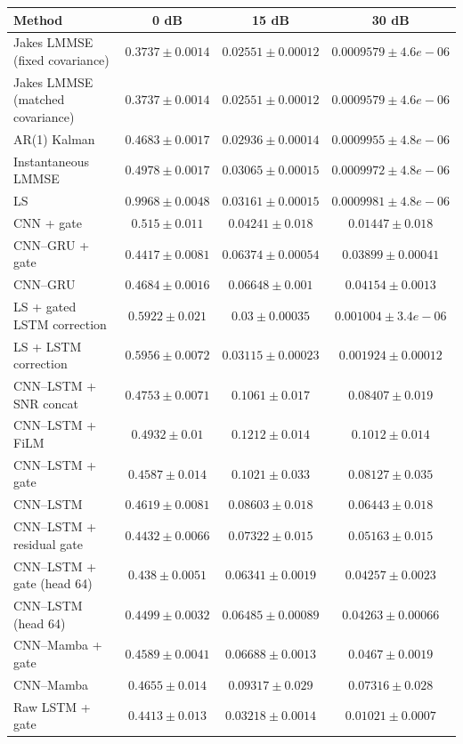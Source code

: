 \begin{tabular}{lccc}
\hline
Method & 0 dB & 15 dB & 30 dB \\
\hline
Jakes LMMSE (fixed covariance) & $0.3737 \pm 0.0014$ & $0.02551 \pm 0.00012$ & $0.0009579 \pm 4.6e-06$ \\
Jakes LMMSE (matched covariance) & $0.3737 \pm 0.0014$ & $0.02551 \pm 0.00012$ & $0.0009579 \pm 4.6e-06$ \\
AR(1) Kalman & $0.4683 \pm 0.0017$ & $0.02936 \pm 0.00014$ & $0.0009955 \pm 4.8e-06$ \\
Instantaneous LMMSE & $0.4978 \pm 0.0017$ & $0.03065 \pm 0.00015$ & $0.0009972 \pm 4.8e-06$ \\
LS & $0.9968 \pm 0.0048$ & $0.03161 \pm 0.00015$ & $0.0009981 \pm 4.8e-06$ \\
CNN + gate & $0.515 \pm 0.011$ & $0.04241 \pm 0.018$ & $0.01447 \pm 0.018$ \\
CNN--GRU + gate & $0.4417 \pm 0.0081$ & $0.06374 \pm 0.00054$ & $0.03899 \pm 0.00041$ \\
CNN--GRU & $0.4684 \pm 0.0016$ & $0.06648 \pm 0.001$ & $0.04154 \pm 0.0013$ \\
LS + gated LSTM correction & $0.5922 \pm 0.021$ & $0.03 \pm 0.00035$ & $0.001004 \pm 3.4e-06$ \\
LS + LSTM correction & $0.5956 \pm 0.0072$ & $0.03115 \pm 0.00023$ & $0.001924 \pm 0.00012$ \\
CNN--LSTM + SNR concat & $0.4753 \pm 0.0071$ & $0.1061 \pm 0.017$ & $0.08407 \pm 0.019$ \\
CNN--LSTM + FiLM & $0.4932 \pm 0.01$ & $0.1212 \pm 0.014$ & $0.1012 \pm 0.014$ \\
CNN--LSTM + gate & $0.4587 \pm 0.014$ & $0.1021 \pm 0.033$ & $0.08127 \pm 0.035$ \\
CNN--LSTM & $0.4619 \pm 0.0081$ & $0.08603 \pm 0.018$ & $0.06443 \pm 0.018$ \\
CNN--LSTM + residual gate & $0.4432 \pm 0.0066$ & $0.07322 \pm 0.015$ & $0.05163 \pm 0.015$ \\
CNN--LSTM + gate (head 64) & $0.438 \pm 0.0051$ & $0.06341 \pm 0.0019$ & $0.04257 \pm 0.0023$ \\
CNN--LSTM (head 64) & $0.4499 \pm 0.0032$ & $0.06485 \pm 0.00089$ & $0.04263 \pm 0.00066$ \\
CNN--Mamba + gate & $0.4589 \pm 0.0041$ & $0.06688 \pm 0.0013$ & $0.0467 \pm 0.0019$ \\
CNN--Mamba & $0.4655 \pm 0.014$ & $0.09317 \pm 0.029$ & $0.07316 \pm 0.028$ \\
Raw LSTM + gate & $0.4413 \pm 0.013$ & $0.03218 \pm 0.0014$ & $0.01021 \pm 0.0007$ \\
\hline
\end{tabular}
